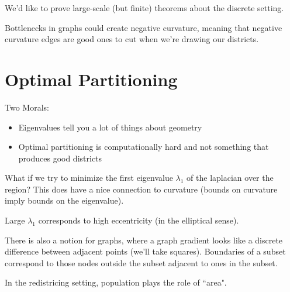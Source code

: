 


We'd like to prove large-scale (but finite) theorems about the discrete setting.


Bottlenecks in graphs could create negative curvature, meaning that negative curvature edges are good ones to cut when we're drawing our districts.


\section*{Optimal Partitioning}

Two Morals:
\begin{itemize}
	\item Eigenvalues tell you a lot of things about geometry
	\item Optimal partitioning is computationally hard and not something that produces good districts
\end{itemize}

What if we try to minimize the first eigenvalue $\lambda_1$ of the laplacian over the region?  This does have a nice connection to curvature (bounds on curvature imply bounds on the eigenvalue).


Large $\lambda_1$ corresponds to high eccentricity (in the elliptical sense).

There is also a notion for graphs, where a graph gradient looks like a discrete difference between adjacent points (we'll take squares).  Boundaries of a subset correspond to those nodes outside the subset adjacent to ones in the subset.


In the redistricing setting, population plays the role of ``area".


